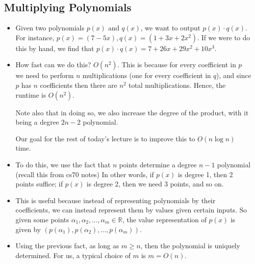 \begin{itemize}
\begin{itemize}
		\end{itemize}
\end{itemize}
\subsection{Multiplying Polynomials}
\begin{itemize}
	\item Given two polynomials \( p(x) \) and \( q(x) \), we want to output \( p(x) \cdot q(x) \). For instance, \( p(x) = 
		(7 - 5x), q(x) = (1 + 3x + 2x^2)\). If we were to do this by hand, we find that \( p(x) \cdot q(x) = 
		7 + 26x + 29x^2 + 10x^3\).
	\item How fast can we do this? \( O(n^2) \). This is because for every coefficient in \( p \) we need to perform 
		\( n \) multiplications (one for every coefficient in \( q \)), and since \( p \) has \( n \) coefficients then there are 
		\( n^2 \) total multiplications. Hence, the runtime is \( O(n^2) \). 

		Note also that in doing so, we also increase the degree of the product, with it being a degree \( 2n-2 \) polynomial.

		Our goal for the rest of today's lecture is to improve this to \( O(n \log n)  \) time.  
	\item To do this, we use the fact that \( n \) points determine a degree \( n-1 \) polynomial (recall this from 
		cs70 notes) In other words, 
		if \( p(x) \) is degree 1, then 2 points suffice; if \( p(x) \) is degree 2, then we need 3 points, and so on.
	\item This is useful because instead of representing polynomials 
		by their coefficients, we can instead represent them by values given certain inputs. So given some points \( \alpha_1, 
		\alpha_2, \dots, \alpha_m \in \mathbb R\), the value representation of \( p(x) \) is given by 
		\( (p(\alpha_1), p(\alpha_2), \dots, p(\alpha_m)) \). 
	\item Using the previous fact, as long as \( m \ge n  \), then the polynomial is uniquely determined. For us, 
		a typical choice of \( m \) is \( m = O(n) \). 
\end{itemize}
